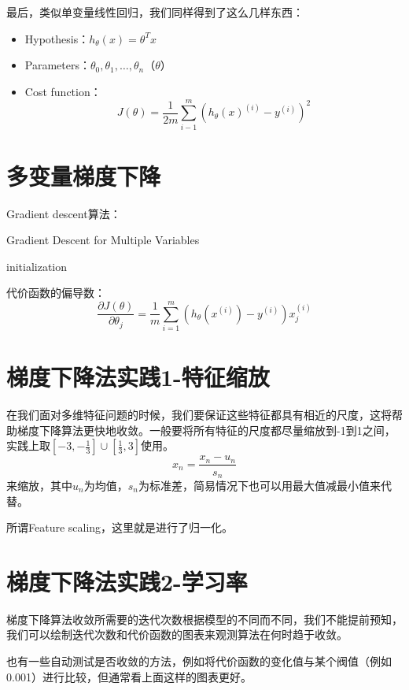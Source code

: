 \documentclass[../main.tex]{subfiles}
\begin{document}
最后，类似单变量线性回归，我们同样得到了这么几样东西：
\begin{itemize}
    \item Hypothesis：\(h_θ(x)= θ^Tx\)
    \item Parameters：\(θ_0, θ_1,\ldots,θ_n\)（\(θ\)）
    \item Cost function：\[J(θ)=\frac{1}{2m}\sum\limits_{i-1}^{m}(h_θ(x)^{(i)}-y^{(i)})^2\]
\end{itemize}


\section{多变量梯度下降}

Gradient descent算法：\\
\begin{algorithm}[H]
    \caption{Gradient Descent for Multiple Variables}
    initialization\;
\end{algorithm}
代价函数的偏导数：
\[
    \frac{∂J(θ)}{∂θ_j}=
    \frac{1}{m}\sum\limits_{i=1}^m(h_θ(x^{(i)})-y^{(i)})x_j^{(i)}
\]

\section{梯度下降法实践1-特征缩放}
在我们面对多维特征问题的时候，我们要保证这些特征都具有相近的尺度，这将帮助梯度下降算法更快地收敛。一般要将所有特征的尺度都尽量缩放到-1到1之间，实践上取\([-3,-\frac{1}{3}]∪[\frac{1}{3},3]\)使用。
\[x_n = \frac{x_n-u_n}{s_n}\]
来缩放，其中\(u_n\)为均值，\(s_n\)为标准差，简易情况下也可以用最大值减最小值来代替。

\begin{remark}
    所谓Feature scaling，这里就是进行了归一化。
\end{remark}

\section{梯度下降法实践2-学习率}
梯度下降算法收敛所需要的迭代次数根据模型的不同而不同，我们不能提前预知，我们可以绘制迭代次数和代价函数的图表来观测算法在何时趋于收敛。


也有一些自动测试是否收敛的方法，例如将代价函数的变化值与某个阀值（例如0.001）进行比较，但通常看上面这样的图表更好。
\end{document}
